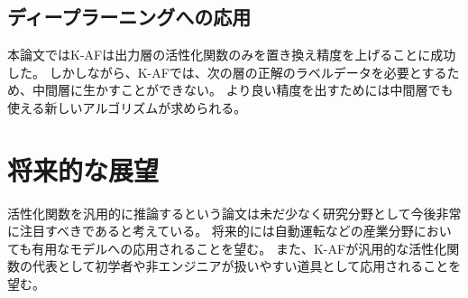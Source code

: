 \subsection{ディープラーニングへの応用}
本論文ではK-AFは出力層の活性化関数のみを置き換え精度を上げることに成功した。
しかしながら、K-AFでは、次の層の正解のラベルデータを必要とするため、中間層に生かすことができない。
より良い精度を出すためには中間層でも使える新しいアルゴリズムが求められる。



\section{将来的な展望}

活性化関数を汎用的に推論するという論文は未だ少なく研究分野として今後非常に注目すべきであると考えている。 
将来的には自動運転などの産業分野においても有用なモデルへの応用されることを望む。
また、K-AFが汎用的な活性化関数の代表として初学者や非エンジニアが扱いやすい道具として応用されることを望む。


